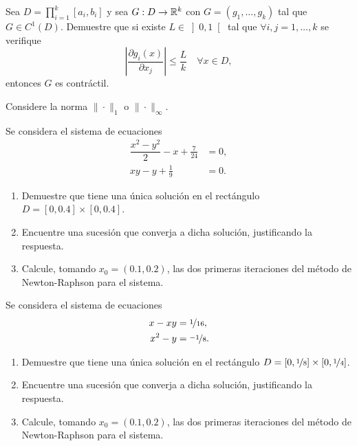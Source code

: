 \begin{ejercicio}\label{ej:1.16}
    Sea $D = \prod\limits_{i=1}^k[a_i, b_i]$ y sea $G : D \to \mathbb{R}^k$ con $G = (g_1, \ldots, g_k)$ tal que $G \in C^1(D)$. Demuestre que si existe $L \in\left]0, 1\right[$ tal que $\forall i, j = 1, \ldots, k$ se verifique
    \begin{equation*}
        \left\lvert \dfrac{\partial g_i(x)}{\partial x_j} \right\rvert \leq \dfrac{L}{k}\quad \forall x \in D,
    \end{equation*}
    entonces $G$ es contráctil.
    \begin{observacion}
        Considere la norma $\| \cdot \|_1$ o $\| \cdot \|_\infty$.
    \end{observacion}
\end{ejercicio}

\begin{ejercicio}\label{ej:1.17}
    Se considera el sistema de ecuaciones
    \begin{align*}
        \dfrac{x^2-y^2}{2}-x + \frac{7}{24} &= 0, \\
        xy - y + \frac{1}{9} &= 0.
    \end{align*}
    \begin{enumerate}
        \item Demuestre que tiene una única solución en el rectángulo $D = [0, 0.4] \times [0, 0.4]$.
        \item Encuentre una sucesión que converja a dicha solución, justificando la respuesta.
        \item Calcule, tomando $x_0 = (0.1, 0.2)$, las dos primeras iteraciones del método de Newton-Raphson para el sistema.
    \end{enumerate}
\end{ejercicio}


\begin{ejercicio}\label{ej:1.18}
    Se considera el sistema de ecuaciones
    \begin{align*}
        x - xy &= \nicefrac{1}{16}, \\
        x^2 - y &= \nicefrac{-1}{8}.
    \end{align*}
    \begin{enumerate}
        \item Demuestre que tiene una única solución en el rectángulo $D = [0, \nicefrac{1}{8}] \times [0, \nicefrac{1}{4}]$.
        \item Encuentre una sucesión que converja a dicha solución, justificando la respuesta.
        \item Calcule, tomando $x_0 = (0.1, 0.2)$, las dos primeras iteraciones del método de Newton-Raphson para el sistema.
    \end{enumerate}
\end{ejercicio}